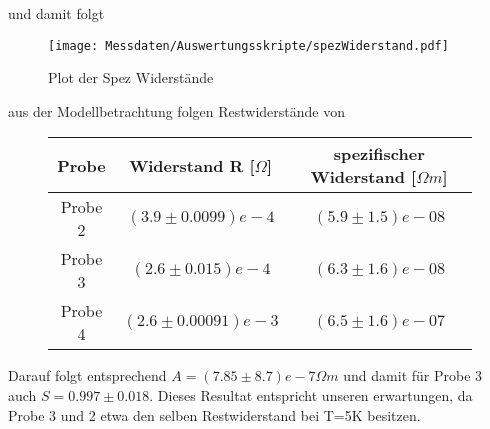     und damit folgt
    \begin{figure}[H]
        \centering
        \texttt{[image: Messdaten/Auswertungsskripte/spezWiderstand.pdf]}
        \caption{Plot der Spez Widerstände}
        \label{spec resistance plot}
    \end{figure}
    aus der Modellbetrachtung folgen Restwiderstände von
    \begin{figure}[H]
        \centering
        \begin{tabular}{c|c|c}
            Probe & Widerstand R [$\Omega$] &spezifischer Widerstand [$\Omega m$] \\
            \hline
            Probe 2 & $(3.9\pm 0.0099)e-4 $ & $(5.9\pm 1.5)e-08$ \\
            Probe 3 & $(2.6\pm 0.015)e-4 $ & $(6.3\pm 1.6)e-08$ \\
            Probe 4 & $(2.6\pm 0.00091)e-3 $ & $(6.5\pm 1.6)e-07$ \\
        \end{tabular}
    \end{figure}
    Darauf folgt entsprechend $A=(7.85\pm8.7)e-7 \Omega m$ und damit für Probe 3 auch $S=0.997 \pm 0.018$. Dieses Resultat
    entspricht unseren erwartungen, da Probe 3 und 2 etwa den selben Restwiderstand bei T=5K besitzen.